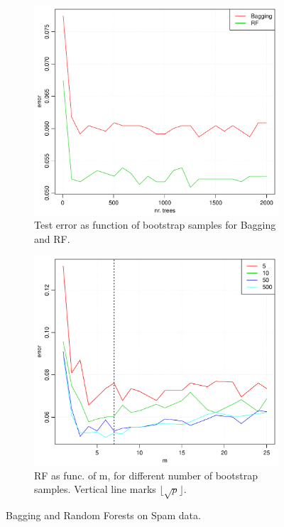 \begin{figure}[htbp]
  \centering
  \begin{subfigure}[b]{0.48\textwidth}
    \includegraphics[width=\textwidth]{./figures/baggingAndRFSpam.pdf}
    \caption{Test error as function of bootstrap samples for Bagging and RF.}
    \label{fig:baggingAndRFSpam}
  \end{subfigure}%
  \quad
  \begin{subfigure}[b]{0.48\textwidth}
    \includegraphics[width=\textwidth]{./figures/RFSpam.pdf}
    \caption{RF as func. of m, for different number of bootstrap samples. Vertical line marks $\lfloor \sqrt{p} \rfloor$.}
    \label{fig:RFSpam}
  \end{subfigure}
  \vspace{1\baselineskip}
  \caption{Bagging and Random Forests on Spam data.}
  \label{fig:baggAndRF}
\end{figure}
